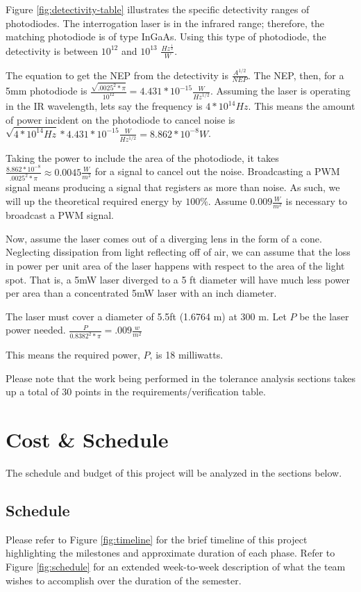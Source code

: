 \documentclass[openbib,letterpaper,10pt]{article}
\begin{document}
\begin{spacing}{1.15}
Figure \ref{fig:detectivity-table} illustrates the specific detectivity ranges of photodiodes. The interrogation laser is in the infrared range; therefore, the matching photodiode is of type InGaAs. Using this type of photodiode, the detectivity is between $10^{12}$ and $10^{13}$ $\frac{Hz^{\frac{1}{2}}}{W}$. 

The equation to get the NEP from the detectivity is $\frac{A^{1/2}}{NEP}$. The NEP, then, for a 5mm photodiode is $\frac{\sqrt{.0025^2 * \pi}}{10^{12}} = 4.431 * 10^{-15} \frac{W}{Hz^{1/2}}$. Assuming the laser is operating in the IR wavelength, lets say the frequency is $4*10^{14} Hz$. This means the amount of power incident on the photodiode to cancel noise is $\sqrt{4*10^{14}Hz} * 4.431 * 10^{-15} \frac{W}{Hz^{1/2}} = 8.862*10^{-8} W$. 

Taking the power to include the area of the photodiode, it takes $\frac{8.862*10^{-8}}{.0025^2 * \pi} \approx 0.0045 \frac{W}{m^2}$ for a signal to cancel out the noise. Broadcasting a PWM signal means producing a signal that registers as more than noise. As such, we will up the theoretical required energy by $100\%$. Assume $0.009 \frac{W}{m^2}$ is necessary to broadcast a PWM signal. 

Now, assume the laser comes out of a diverging lens in the form of a cone. Neglecting dissipation from light reflecting off of air, we can assume that the loss in power per unit area of the laser happens with respect to the area of the light spot. That is, a 5mW laser diverged to a 5 ft diameter will have much less power per area than a concentrated 5mW laser with an inch diameter.

The laser must cover a diameter of 5.5ft (1.6764 m) at 300 m. Let $P$ be the laser power needed. $\frac{P}{0.8382^2* \pi} = .009  \frac{w}{m^2}$

This means the required power, $P$, is 18 milliwatts. 

Please note that the work being performed in the tolerance analysis sections takes up a total of 30 points in the requirements/verification table. 


\section{Cost \& Schedule}
The schedule and budget of this project will be analyzed in the sections below.

\subsection{Schedule}
Please refer to Figure \ref{fig:timeline} for the brief timeline of this project highlighting the milestones and approximate duration of each phase. Refer to Figure \ref{fig:schedule} for an extended week-to-week description of what the team wishes to accomplish over the duration of the semester.



\end{spacing}
\end{document}

